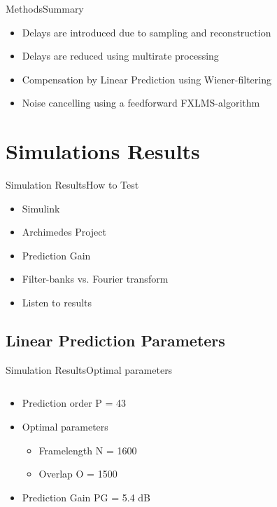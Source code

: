 \begin{frame}{Methods}{Summary}	
\begin{itemize}
	\item Delays are introduced due to sampling and reconstruction
	\item Delays are reduced using multirate processing
	\item Compensation by Linear Prediction using Wiener-filtering
	\item Noise cancelling using a feedforward FXLMS-algorithm
\end{itemize}
\end{frame}










\section{Simulations Results}


\begin{frame}{Simulation Results}{How to Test}	
\begin{itemize}
	\item Simulink 
	\item Archimedes Project
	\item Prediction Gain
	\item Filter-banks vs. Fourier transform
	\item Listen to results			
\end{itemize}
\end{frame}

\subsection{Linear Prediction Parameters}
\begin{frame}{Simulation Results}{Optimal parameters}		
\begin{columns}
	\begin{column}{0.4\textwidth}
		\begin{itemize}
			\item Prediction order P = 43
			\item Optimal parameters
			\begin{itemize}
				\item Framelength N = 1600
				\item Overlap O = 1500
			\end{itemize}
			\item Prediction Gain PG = 5.4 dB
		\end{itemize}
	\end{column}
	\begin{column}{0.6\textwidth} 
		\resizebox{0.9\columnwidth}{!}{		
			}
	\end{column}
\end{columns}
\end{frame}

